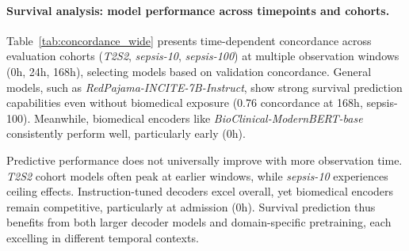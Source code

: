 
\paragraph{Survival analysis: model performance across timepoints and cohorts.}
Table~\ref{tab:concordance_wide} presents time-dependent concordance across evaluation cohorts (\textit{T2S2}, \textit{sepsis-10}, \textit{sepsis-100}) at multiple observation windows (0h, 24h, 168h), selecting models based on validation concordance. General models, such as \textit{RedPajama-INCITE-7B-Instruct}, show strong survival prediction capabilities even without biomedical exposure (0.76 concordance at 168h, sepsis-100). Meanwhile, biomedical encoders like \textit{BioClinical-ModernBERT-base} consistently perform well, particularly early (0h).

Predictive performance does not universally improve with more observation time. \textit{T2S2} cohort models often peak at earlier windows, while \textit{sepsis-10} experiences ceiling effects. Instruction-tuned decoders excel overall, yet biomedical encoders remain competitive, particularly at admission (0h). Survival prediction thus benefits from both larger decoder models and domain-specific pretraining, each excelling in different temporal contexts.





